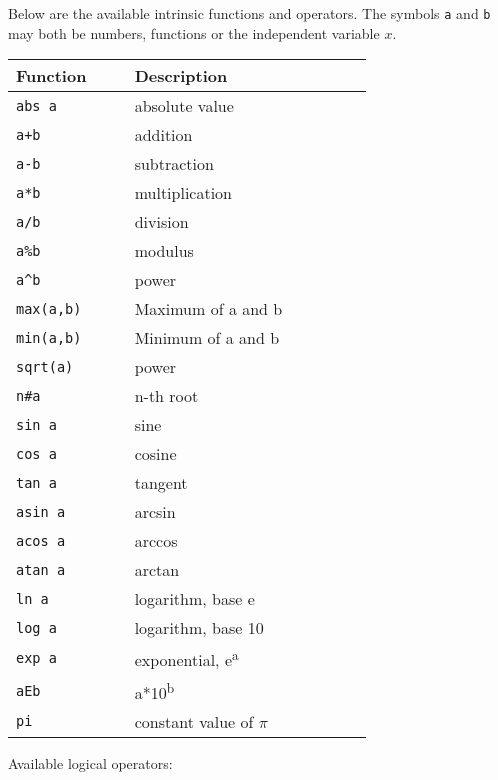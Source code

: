 Below are the available intrinsic functions and operators.
The symbols {\tt a} and {\tt b} may both be numbers, functions or
the independent variable $x$.

\begin{center}
\vspace{0.3cm}
\begin{tabular}{|>{\raggedright} p{0.23\linewidth}| p{0.48\linewidth}|}
  \hline
  \rowcolor[HTML]{EFEFEF}
  Function & Description   \\
  \hline\hline
  {\tt abs a} & absolute value  \\
  \hline
  {\tt a+b} & addition \\
  \hline
  {\tt a-b} & subtraction \\
  \hline
  {\tt a*b} & multiplication \\
  \hline
  {\tt a/b} & division \\
  \hline
  {\tt a\%b} & modulus \\
  \hline
  {\tt a\^{}b} & power \\
  \hline
  {\tt max(a,b)} & Maximum of a and b \\
  \hline
  {\tt min(a,b)} & Minimum of a and b \\
  \hline
  {\tt sqrt(a)} & power \\
  \hline
  {\tt n\#a} & n-th root \\
  \hline
  {\tt sin a} & sine \\
  \hline
  {\tt cos a} & cosine \\
  \hline
  {\tt tan a} & tangent \\
  \hline
  {\tt asin a} & arcsin \\
  \hline
  {\tt acos a} & arccos \\
  \hline
  {\tt atan a} & arctan \\
  \hline
  {\tt ln a} & logarithm, base e \\
  \hline
  {\tt log a} & logarithm, base 10 \\
  \hline
  {\tt exp a} & exponential, e\textsuperscript{a} \\
  \hline
  {\tt aEb} & a*10\textsuperscript{b} \\
  \hline
  {\tt pi} & constant value of $\pi$ \\
\hline\end{tabular}
\end{center}

\clearpage
Available logical operators:

